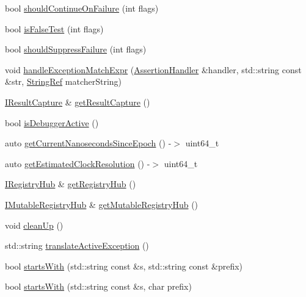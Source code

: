 \begin{DoxyCompactItemize}
\item 
bool \mbox{\hyperlink{namespaceCatch_a7f7480b15d74965459c844f0d393ed87}{should\+Continue\+On\+Failure}} (int flags)
\item 
bool \mbox{\hyperlink{namespaceCatch_a93ef4e3e307a2021ca0d41b32c0e54b0}{is\+False\+Test}} (int flags)
\item 
bool \mbox{\hyperlink{namespaceCatch_ab91eb13081203d634fe48d3d2ab386d7}{should\+Suppress\+Failure}} (int flags)
\item 
void \mbox{\hyperlink{namespaceCatch_a53ff6b1a7152359be73802b6f121fef0}{handle\+Exception\+Match\+Expr}} (\mbox{\hyperlink{classCatch_1_1AssertionHandler}{Assertion\+Handler}} \&handler, std\+::string const \&str, \mbox{\hyperlink{classCatch_1_1StringRef}{String\+Ref}} matcher\+String)
\item 
\mbox{\hyperlink{structCatch_1_1IResultCapture}{I\+Result\+Capture}} \& \mbox{\hyperlink{namespaceCatch_aff60c1de6ac6cea30175d70e33d83c8e}{get\+Result\+Capture}} ()
\item 
bool \mbox{\hyperlink{namespaceCatch_ab079497368fb1df25af39ad494d2a241}{is\+Debugger\+Active}} ()
\item 
auto \mbox{\hyperlink{namespaceCatch_a98d058468488c486a9cb5c8463f3ba29}{get\+Current\+Nanoseconds\+Since\+Epoch}} () -\/$>$ uint64\+\_\+t
\item 
auto \mbox{\hyperlink{namespaceCatch_ac8e1ed37624bd0d97b2c0d4ec099d31f}{get\+Estimated\+Clock\+Resolution}} () -\/$>$ uint64\+\_\+t
\item 
\mbox{\hyperlink{structCatch_1_1IRegistryHub}{I\+Registry\+Hub}} \& \mbox{\hyperlink{namespaceCatch_ac24b072979540bfd922e7d46e899f46f}{get\+Registry\+Hub}} ()
\item 
\mbox{\hyperlink{structCatch_1_1IMutableRegistryHub}{I\+Mutable\+Registry\+Hub}} \& \mbox{\hyperlink{namespaceCatch_ac9ddcc6d66079add9cb2a3140b8ae51e}{get\+Mutable\+Registry\+Hub}} ()
\item 
void \mbox{\hyperlink{namespaceCatch_a0f78e9afdebc6d4512d18e76fbf54b8c}{clean\+Up}} ()
\item 
std\+::string \mbox{\hyperlink{namespaceCatch_adafff91485eeeeb9e9333f317cc0e3b1}{translate\+Active\+Exception}} ()
\item 
bool \mbox{\hyperlink{namespaceCatch_a695f62327be0676e046291eeaae15110}{starts\+With}} (std\+::string const \&s, std\+::string const \&prefix)
\item 
bool \mbox{\hyperlink{namespaceCatch_acad23751846ac23d0f379e34f5adebb1}{starts\+With}} (std\+::string const \&s, char prefix)

\end{DoxyCompactItemize}
